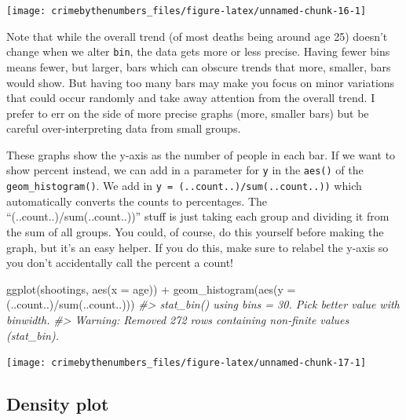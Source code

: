 \documentclass[
  12pt,
]{book}
\newenvironment{Shaded}{\begin{snugshade}}{\end{snugshade}}
\newcommand{\AttributeTok}[1]{\textcolor[rgb]{0.61,0.61,0.61}{#1}}
\newcommand{\CommentTok}[1]{\textcolor[rgb]{0.37,0.37,0.37}{\textit{#1}}}
\newcommand{\FunctionTok}[1]{\textcolor[rgb]{0,0,0}{#1}}
\newcommand{\NormalTok}[1]{#1}
\newcommand{\SpecialCharTok}[1]{\textcolor[rgb]{0,0,0}{#1}}
\begin{document}
\begin{center}\texttt{[image: crimebythenumbers\_files/figure-latex/unnamed-chunk-16-1]} \end{center}

Note that while the overall trend (of most deaths being around age 25) doesn't change when we alter \texttt{bin}, the data gets more or less precise. Having fewer bins means fewer, but larger, bars which can obscure trends that more, smaller, bars would show. But having too many bars may make you focus on minor variations that could occur randomly and take away attention from the overall trend. I prefer to err on the side of more precise graphs (more, smaller bars) but be careful over-interpreting data from small groups.

These graphs show the y-axis as the number of people in each bar. If we want to show percent instead, we can add in a parameter for \texttt{y} in the \texttt{aes()} of the \texttt{geom\_histogram()}. We add in \texttt{y\ =\ (..count..)/sum(..count..))} which automatically converts the counts to percentages. The ``(..count..)/sum(..count..))'' stuff is just taking each group and dividing it from the sum of all groups. You could, of course, do this yourself before making the graph, but it's an easy helper. If you do this, make sure to relabel the y-axis so you don't accidentally call the percent a count!

\begin{Shaded}
\begin{Highlighting}[]
\FunctionTok{ggplot}\NormalTok{(shootings, }\FunctionTok{aes}\NormalTok{(}\AttributeTok{x =}\NormalTok{ age)) }\SpecialCharTok{+} 
  \FunctionTok{geom\_histogram}\NormalTok{(}\FunctionTok{aes}\NormalTok{(}\AttributeTok{y =}\NormalTok{ (..count..)}\SpecialCharTok{/}\FunctionTok{sum}\NormalTok{(..count..)))}
\CommentTok{\#\textgreater{} \textasciigrave{}stat\_bin()\textasciigrave{} using \textasciigrave{}bins = 30\textasciigrave{}. Pick better value with \textasciigrave{}binwidth\textasciigrave{}.}
\CommentTok{\#\textgreater{} Warning: Removed 272 rows containing non{-}finite values (stat\_bin).}
\end{Highlighting}
\end{Shaded}

\begin{center}\texttt{[image: crimebythenumbers\_files/figure-latex/unnamed-chunk-17-1]} \end{center}

\hypertarget{density-plot}{%
\subsection{Density plot}\label{density-plot}}
\end{document}
